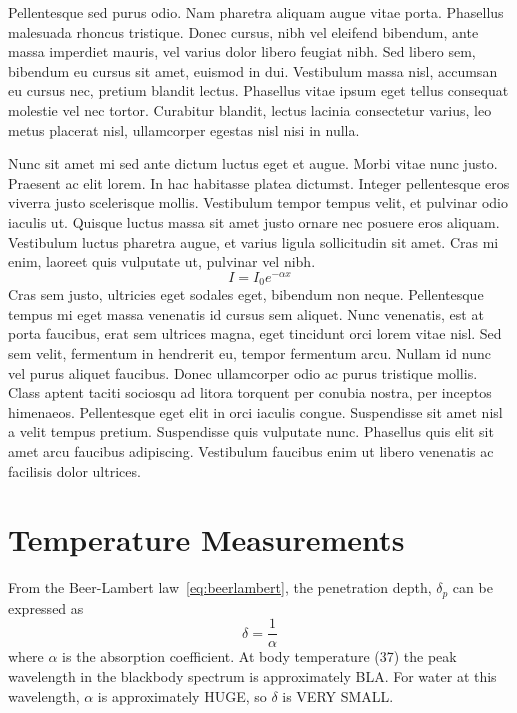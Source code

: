 Pellentesque sed purus odio. Nam pharetra aliquam augue vitae porta. Phasellus malesuada rhoncus tristique. Donec cursus, nibh vel eleifend bibendum, ante massa imperdiet mauris, vel varius dolor libero feugiat nibh. Sed libero sem, bibendum eu cursus sit amet, euismod in dui. Vestibulum massa nisl, accumsan eu cursus nec, pretium blandit lectus. Phasellus vitae ipsum eget tellus consequat molestie vel nec tortor. Curabitur blandit, lectus lacinia consectetur varius, leo metus placerat nisl, ullamcorper egestas nisl nisi in nulla.

Nunc sit amet mi sed ante dictum luctus eget et augue. Morbi vitae nunc justo. Praesent ac elit lorem. In hac habitasse platea dictumst. Integer pellentesque eros viverra justo scelerisque mollis. Vestibulum tempor tempus velit, et pulvinar odio iaculis ut. Quisque luctus massa sit amet justo ornare nec posuere eros aliquam. Vestibulum luctus pharetra augue, et varius ligula sollicitudin sit amet. Cras mi enim, laoreet quis vulputate ut, pulvinar vel nibh.
\begin{equation}
  I = I_0 e^{-\alpha x} \label{eq:beerlambert}
\end{equation}
Cras sem justo, ultricies eget sodales eget, bibendum non neque. Pellentesque tempus mi eget massa venenatis id cursus sem aliquet. Nunc venenatis, est at porta faucibus, erat sem ultrices magna, eget tincidunt orci lorem vitae nisl. Sed sem velit, fermentum in hendrerit eu, tempor fermentum arcu. Nullam id nunc vel purus aliquet faucibus. Donec ullamcorper odio ac purus tristique mollis. Class aptent taciti sociosqu ad litora torquent per conubia nostra, per inceptos himenaeos. Pellentesque eget elit in orci iaculis congue. Suspendisse sit amet nisl a velit tempus pretium. Suspendisse quis vulputate nunc. Phasellus quis elit sit amet arcu faucibus adipiscing. Vestibulum faucibus enim ut libero venenatis ac facilisis dolor ultrices.


\section{Temperature Measurements}


From the Beer-Lambert law~\cref{eq:beerlambert}, the penetration depth, $\delta_{p}$ can be expressed as 
\begin{equation}
  \delta = \frac{1}{\alpha} \label{eq:penetrationdepth}
\end{equation}
where $\alpha$ is the absorption coefficient.  At body temperature (37\degree) the peak wavelength in the blackbody spectrum is approximately BLA.  For water at this wavelength, $\alpha$ is approximately HUGE, so $\delta$ is VERY SMALL. 


